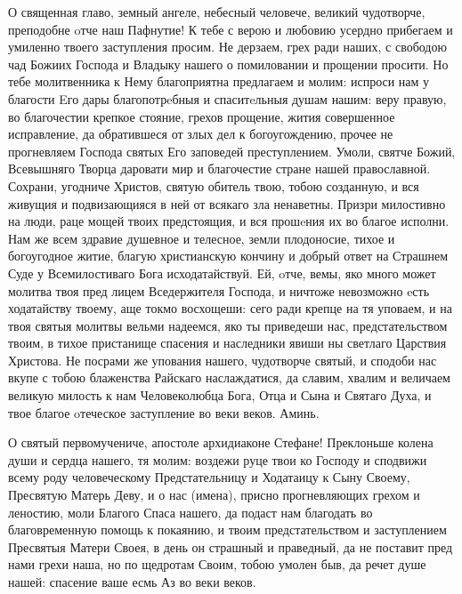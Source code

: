 \begin{mymulticols}




О священная главо, земный ангеле, небесный человече, великий чудотворче, преподобне oтче наш Пафнутие! К тебе с верою и любовию усердно прибегаем и умиленно твоего заступления просим. Не дерзаем, грех ради наших, с свободою чад Божиих Господа и Владыку нашего о помиловании и прощении просити. Но тебе молитвенника к Нему благоприятна предлагаем и молим: испроси нам у благости Eго дары благопотрeбныя и спаситeльныя душам нашим: веру правую, во благочестии крепкое стояние, грехов прощение, жития совершенное исправление, да обратившеся от злых дел к богоугождению, прочее не прогневляем Господа святых Его заповедей преступлением. Умоли, святче Божий, Всевышняго Творца даровати мир и благочестие стране нашей православной. Сохрани, угодниче Христов, святую обитель твою, тобою созданную, и вся живущия и подвизающияся в ней от всякаго зла ненаветны. Призри милостивно на люди, раце мощей твоих предстоящия, и вся прошeния их во благое исполни. Нам же всем здравие душевное и телесное, земли плодоносие, тихое и богоугодное житие, благую христианскую кончину и добрый ответ на Страшнем Суде у Всемилостиваго Бога исходатайствуй. Ей, oтче, вемы, яко много может молитва твоя пред лицем Вседержителя Господа, и ничтоже невозможно eсть ходатайству твоему, аще токмо восхощеши: сего ради крепце на тя уповаем, и на твоя святыя молитвы вельми надеемся, яко ты приведеши нас, предстательством твоим, в тихое пристанище спасения и наследники явиши ны светлаго Царствия Христова. Не посрами же упования нашего, чудотворче святый, и сподоби нас вкупе с тобою блаженства Райскаго наслаждатися, да славим, хвалим и величаем великую милость к нам Человеколюбца Бога, Отца и Сына и Святаго Духа, и твое благое oтеческое заступление во веки веков. Аминь.

\end{mymulticols}

\mychapterending


\begin{mymulticols}


О святый первомучениче, апостоле архидиаконе Стефане! Преклоньше колена души и сердца нашего, тя молим: воздежи руце твои ко Господу и сподвижи всему роду человеческому Предстательницу и Ходатаицу к Сыну Своему, Пресвятую Матерь Деву, и о нас (имена), присно прогневляющих грехом и леностию, моли Благого Спаса нашего, да подаст нам благодать во благовременную помощь к покаянию, и твоим предстательством и заступлением Пресвятыя Матери Своея, в день он страшный и праведный, да не поставит пред нами грехи наша, но по щедротам Своим, тобою умолен быв, да речет душе нашей: спасение ваше есмь Аз во веки веков.


\end{mymulticols}

